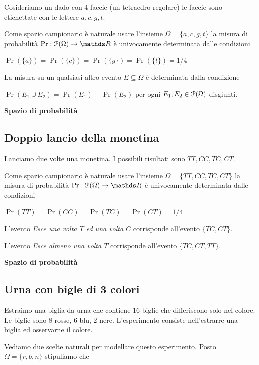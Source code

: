 \documentclass[11pt,openany]{book}
\def\RR{\mathds R}
\def\P{\EuScript P}
\begin{document}
Cosideriamo un dado con $4$ faccie (un tetraedro regolare) le faccie sono etichettate con le lettere $a, c, g, t$. 

Come spazio campionario è naturale usare l'insieme $\Omega=\{a, c, g, t\}$ la misura di probabilità $\Pr:\P(\Omega)\to\RR$ è univocamente determinata dalle condizioni

$\Pr(\{a\})=\Pr(\{c\})=\Pr(\{g\})=\Pr(\{t\})=1/4$

La misura su un qualsiasi altro evento $E\subseteq\Omega$ è determinata dalla condizione 

$\Pr(E_1\cup E_2)=\Pr(E_1)+\Pr(E_2)$ per ogni $E_1,E_2\in\P(\Omega)$ disgiunti.



\clearpage\hfill\textbf{Spazio di probabilità}
\subsection{Doppio lancio della monetina}
\label{doppo_lancio_moneta}

Lanciamo due volte una monetina. I possibili risultati sono $TT, CC, TC, CT$. 

Come spazio campionario è naturale usare l'insieme $\Omega=\{TT, CC, TC, CT\}$ la misura di probabilità $\Pr:\P(\Omega)\to\RR$ è univocamente determinata dalle condizioni

$\Pr(TT)=\Pr(CC)=\Pr(TC)=\Pr(CT)=1/4$

L'evento \textit{Esce una volta $T$ ed una volta $C$\/} corrisponde all'evento $\{TC, CT\}$.

L'evento \textit{Esce almeno una volta $T$\/} corrisponde all'evento $\{TC, CT, TT\}$.



\clearpage\hfill\textbf{Spazio di probabilità}
\subsection{Urna con bigle di 3 colori}
\label{urna_3_colori}

Estraimo una biglia da urna che contiene $16$ biglie che differiscono solo nel colore.
Le biglie sono $8$ rosse, $6$ blu, $2$ nere.
L'esperimento consiste nell'estrarre una biglia ed osservarne il colore.

Vediamo due scelte naturali per modellare questo esperimento. 
Posto $\Omega=\{r,b,n\}$ stipuliamo che


\end{document}
